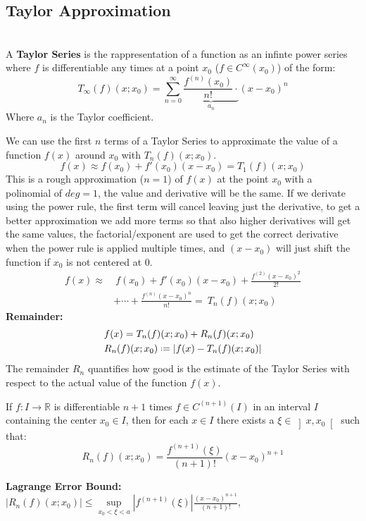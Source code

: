 \documentclass[8pt,a4paper]{extarticle}     %
\theoremstyle{definition}
\theoremstyle{definition}
\theoremstyle{definition}
\newcommand{\R}{\mathbb{R}}
\newcommand*{\defeq}{\mathrel{\vcenter{\baselineskip0.5ex \lineskiplimit0pt
            \hbox{\scriptsize.}\hbox{\scriptsize.}}}%
            =}
\begin{document}
\begin{multicols}{4}
\subsection{Taylor Approximation}
\begin{boxdefinition}\ \\
	A \textbf{Taylor Series} is the rappresentation of a function as an infinte power series where $f$ is differentiable any times at a point $x_0$ ($f\in C^\infty(x_0)$) of the form: 
	$$T_{\infty}(f)(x;x_0) = \sum_{n=0}^\infty \underbrace{\frac{f^{(n)}(x_0)}{n!}\cdot}_{a_n}(x-x_0)^n$$
	Where $a_n$ is the Taylor coefficient. 
\end{boxdefinition}
We can use the first $n$ terms of a Taylor Series to approximate the value of a function $f(x)$ around $x_0$ with $T_{n}(f)(x;x_0)$.  
$$f(x) \approx f(x_0) + f'(x_0)(x-x_0) = T_{1}(f)(x;x_0)$$
This is a rough approximation ($n=1$) of $f(x)$ at the point $x_0$ with a polinomial of $deg=1$, the value and derivative will be the same. If we derivate using the power rule, the first term will cancel leaving just the derivative, to get a better approximation we add more terms so that also higher derivatives will get the same values, the factorial/exponent are used to get the correct derivative when the power rule is applied multiple times, and $(x-x_0)$ will just shift the function if $x_0$ is not centered at 0.
\[
\begin{split}
	f(x) \approx& \ f(x_0) + f'(x_0)(x-x_0) +\frac{f^{(2)}(x-x_0)^2}{2!} \\
	 &+ \cdots +\frac{f^{(n)}(x-x_0)^n}{n!} = \ T_{n}(f)(x;x_0) 
\end{split}
\]
\textbf{Remainder:} 
\[
\begin{split}
	&f(x) = T_{n}(f)(x;x_0) + R_{n}(f)(x;x_0)  \\
	&R_{n}(f)(x;x_0) \defeq |f(x)-T_{n}(f)(x;x_0)|
\end{split}
\]
The remainder $R_n$ quantifies how good is the estimate of the Taylor Series with respect to the actual value of the function $f(x)$.

\begin{boxtheorem} 
	If $f:I\rightarrow\R$ is differentiable $n+1$ times $f \in C^{(n+1)}(I)$ in an interval $I$ containing the center $x_0\in I$, then for each $x\in I$ there exists a $\xi \in \left]x,x_0\right[$ such that:
	$$ R_{n}(f)(x;x_0) = \frac{f^{(n+1)}(\xi)}{(n+1)!}(x-x_0)^{n+1}$$
\end{boxtheorem}
\textbf{Lagrange Error Bound:} \\
$|R_{n}(f)(x;x_0)| \leq \underset{x_0<\xi<a}{\sup}\left|f^{(n+1)}(\xi)\right|\frac{(x-x_0)^{n+1}}{(n+1)!}$,



\end{multicols}
\end{document}
